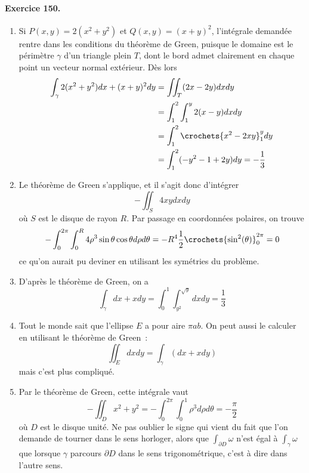 \paragraph{Exercice 150.}
\begin{enumerate}
\item Si $P(x,y) = 2 (x^2 + y^2)$ et $Q(x,y) = (x+y)^2$, l'intégrale
demandée rentre dans les conditions du théorème de Green, puisque le
domaine est le périmètre $\gamma$ d'un triangle plein $T$, dont le bord
admet clairement en chaque point un vecteur normal extérieur. Dès
lors
\begin{equation*}
\begin{split}
\int_\gamma 2 (x^2 + y^2) d x + (x+y)^2 d y &= \iint_T (2 x -
2 y )d x d y\\
&= \int_1^2\int_1^y 2 (x-y) d x d y\\
&= \int_1^2 \crochets{x^2 - 2 x y}_1^y d y\\
&= \int_1^2 (- y^2 - 1 + 2 y) d y = - \frac13
\end{split}
\end{equation*}

\item Le théorème de Green s'applique, et il s'agit donc d'intégrer
\begin{equation*}
- \iint_S 4 x y d x d y
\end{equation*}
où $S$ est le disque de rayon $R$. Par passage en coordonnées polaires, on trouve
\begin{equation*}
- \int_0^{2\pi} \int_0^R 4\rho^3 \sin\theta \cos\theta d \rho d\theta = - R^4 \frac12 \crochets{\sin^2(\theta)}_0^{2\pi} = 0
\end{equation*}
ce qu'on aurait pu deviner en utilisant les symétries du problème.

\item D'après le théorème de Green, on a
\begin{equation*}
\int_\gamma d x + x d y = \int_0^1 \int_{y^2}^{\sqrt y} d x
d y = \frac13
\end{equation*}

\item Tout le monde sait que l'ellipse $E$ a pour aire $\pi a b$. On
peut aussi le calculer en utilisant le théorème de Green~:
\begin{equation*}
\iint_E d x d y = \int_\gamma (d x + x d y)
\end{equation*}
mais c'est plus compliqué.

\item Par le théorème de Green, cette intégrale vaut
\begin{equation*}
-\iint_D x^2 + y^2 = -\int_0^{2\pi}\int_0^1 \rho^3 d\rho d \theta
= -\frac\pi2
\end{equation*}
où $D$ est le disque unité. Ne pas oublier le signe qui vient du fait que l'on demande de tourner dans le sens horloger, alors que $\int_{\partial D}\omega$ n'est égal à $\int_{\gamma}\omega$ que lorsque $\gamma$ parcours $\partial D$ dans le sens trigonométrique, c'est à dire dans l'autre sens.
\end{enumerate}

